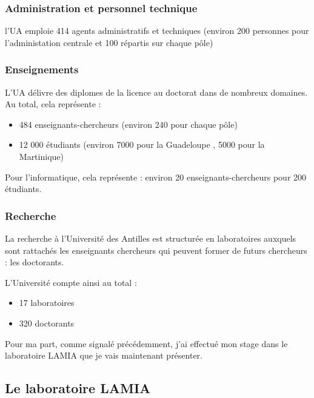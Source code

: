 \hypertarget{administration-et-personnel-technique}{%
\subsubsection{Administration et personnel
technique}
\label{administration-et-personnel-technique}}

l'UA emploie 414 agents administratifs et techniques (environ 200 personnes
pour l'administation centrale et 100 répartis sur chaque pôle)

\hypertarget{enseignements}{%
\subsubsection{Enseignements}\label{enseignements}}

L'UA délivre des diplomes de la licence au doctorat dans de nombreux
domaines. Au total, cela représente :

\begin{itemize}
\tightlist
\item
  484 enseignants-chercheurs (environ 240 pour chaque pôle)
\item
  12 000 étudiants (environ 7000 pour la Guadeloupe , 5000 pour la
  Martinique)
\end{itemize}

Pour l'informatique, cela représente : environ 20
enseignants-chercheurs pour 200 étudiants.

\hypertarget{recherche}{%
\subsubsection{Recherche}\label{recherche}}

La recherche à l'Université des Antilles est structurée en laboratoires auxquels sont rattachés les
enseignants chercheurs qui peuvent former de futurs chercheurs : les
doctorants.

L'Université compte ainsi au total :

\begin{itemize}
\tightlist
\item
  17 laboratoires
\item
  320 doctorants
\end{itemize}

Pour ma part, comme signalé précédemment, j'ai effectué mon stage dans
le laboratoire LAMIA que je vais maintenant présenter.

\hypertarget{le-lamia}{%
\subsection{Le laboratoire LAMIA}\label{le-lamia}}

